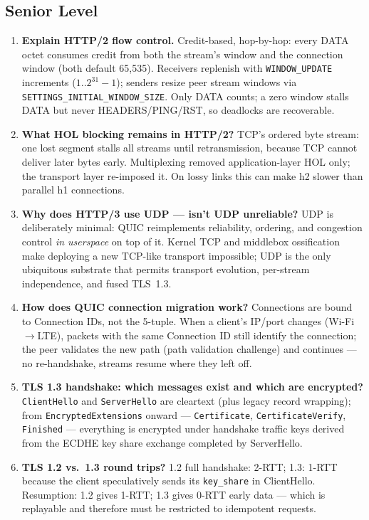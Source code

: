 \subsection*{Senior Level}

\begin{enumerate}[label=\textbf{Q\arabic*.}, leftmargin=2.8em, start=27]
  \item \textbf{Explain HTTP/2 flow control.} Credit-based, hop-by-hop: every DATA octet consumes credit from both the stream's window and the connection window (both default 65{,}535). Receivers replenish with \texttt{WINDOW\_UPDATE} increments ($1..2^{31}-1$); senders resize peer stream windows via \texttt{SETTINGS\_INITIAL\_WINDOW\_SIZE}. Only DATA counts; a zero window stalls DATA but never HEADERS/PING/RST, so deadlocks are recoverable.
  \item \textbf{What HOL blocking remains in HTTP/2?} TCP's ordered byte stream: one lost segment stalls all streams until retransmission, because TCP cannot deliver later bytes early. Multiplexing removed application-layer HOL only; the transport layer re-imposed it. On lossy links this can make h2 slower than parallel h1 connections.
  \item \textbf{Why does HTTP/3 use UDP --- isn't UDP unreliable?} UDP is deliberately minimal: QUIC reimplements reliability, ordering, and congestion control \emph{in userspace} on top of it. Kernel TCP and middlebox ossification make deploying a new TCP-like transport impossible; UDP is the only ubiquitous substrate that permits transport evolution, per-stream independence, and fused TLS~1.3.
  \item \textbf{How does QUIC connection migration work?} Connections are bound to Connection IDs, not the 5-tuple. When a client's IP/port changes (Wi-Fi$\to$LTE), packets with the same Connection ID still identify the connection; the peer validates the new path (path validation challenge) and continues --- no re-handshake, streams resume where they left off.
  \item \textbf{TLS 1.3 handshake: which messages exist and which are encrypted?} \texttt{ClientHello} and \texttt{ServerHello} are cleartext (plus legacy record wrapping); from \texttt{EncryptedExtensions} onward --- \texttt{Certificate}, \texttt{CertificateVerify}, \texttt{Finished} --- everything is encrypted under handshake traffic keys derived from the ECDHE key share exchange completed by ServerHello.
  \item \textbf{TLS 1.2 vs.\ 1.3 round trips?} 1.2 full handshake: 2-RTT; 1.3: 1-RTT because the client speculatively sends its \texttt{key\_share} in ClientHello. Resumption: 1.2 gives 1-RTT; 1.3 gives 0-RTT early data --- which is replayable and therefore must be restricted to idempotent requests.

\end{enumerate}
